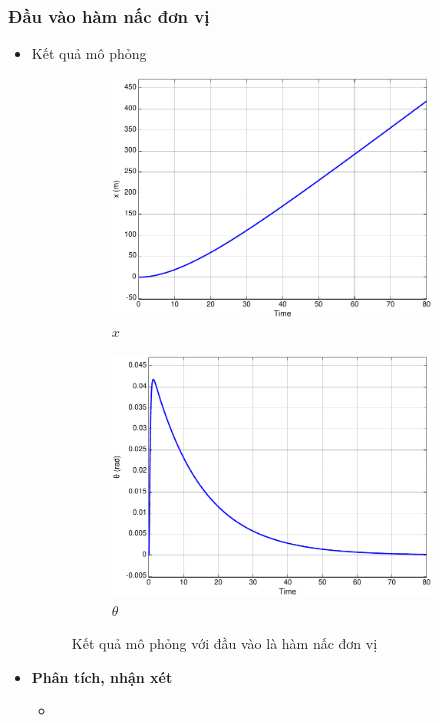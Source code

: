 \documentclass[12pt,a4paper]{article}
\begin{document}
\subsubsection{Đầu vào hàm nấc đơn vị}
\begin{itemize}
    \item Kết quả mô phỏng 
    \begin{figure}[ht]
        \centering
        \begin{subfigure}[b]{0.495\linewidth}
            \centering
            \includegraphics[width=\linewidth]{phan_tich_x_step.pdf}
            \caption{$x$}
        \end{subfigure}\hfill
        \begin{subfigure}[b]{0.495\linewidth}
            \centering
            \includegraphics[width=\linewidth]{phan_tich_theta_step.pdf}
            \caption{$\theta$}
        \end{subfigure}
        \caption{Kết quả mô phỏng với đầu vào là hàm nấc đơn vị}
    \end{figure}
    \item \textbf{Phân tích, nhận xét}
    \begin{itemize}
        \item 
    \end{itemize}
\end{itemize}
\end{document}
